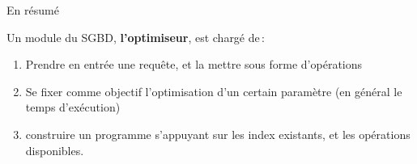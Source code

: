 \begin{tsp}{En résumé}
{
Un module du SGBD, \textbf{l'optimiseur}, est chargé de\,:

\begin{enumerate}
  \item Prendre en entrée une requête, et la mettre sous forme d'opérations

  \item Se fixer comme objectif l'optimisation d'un certain 
           paramètre (en général le temps d'exécution)

    \item construire un programme s'appuyant sur
         les index existants, et les opérations disponibles.
\end{enumerate}

}\end{tsp}
